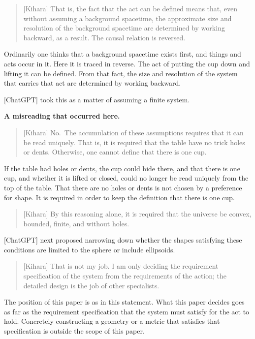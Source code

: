 \documentclass[
  a4paper,
]{article}
\begin{document}
\begin{quote}
{[}Kihara{]} That is, the fact that the act can be defined means that,
even without assuming a background spacetime, the approximate size and
resolution of the background spacetime are determined by working
backward, as a result. The causal relation is reversed.
\end{quote}

Ordinarily one thinks that a background spacetime exists first, and
things and acts occur in it. Here it is traced in reverse. The act of
putting the cup down and lifting it can be defined. From that fact, the
size and resolution of the system that carries that act are determined
by working backward.

{[}ChatGPT{]} took this as a matter of assuming a finite system.

\textbf{A misreading that occurred here.}

\begin{quote}
{[}Kihara{]} No.~The accumulation of these assumptions requires that it
can be read uniquely. That is, it is required that the table have no
trick holes or dents. Otherwise, one cannot define that there is one
cup.
\end{quote}

If the table had holes or dents, the cup could hide there, and that
there is one cup, and whether it is lifted or closed, could no longer be
read uniquely from the top of the table. That there are no holes or
dents is not chosen by a preference for shape. It is required in order
to keep the definition that there is one cup.

\begin{quote}
{[}Kihara{]} By this reasoning alone, it is required that the universe
be convex, bounded, finite, and without holes.
\end{quote}

{[}ChatGPT{]} next proposed narrowing down whether the shapes satisfying
these conditions are limited to the sphere or include ellipsoids.

\begin{quote}
{[}Kihara{]} That is not my job. I am only deciding the requirement
specification of the system from the requirements of the action; the
detailed design is the job of other specialists.
\end{quote}

The position of this paper is as in this statement. What this paper
decides goes as far as the requirement specification that the system
must satisfy for the act to hold. Concretely constructing a geometry or
a metric that satisfies that specification is outside the scope of this
paper.
\end{document}
